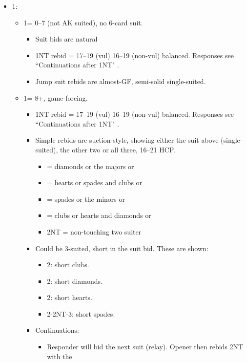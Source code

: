\documentclass[a4paper,14pt]{extarticle}
\begin{document}
\begin{itemize}
\label{note:13}
\item 1\diamonds:
	\begin{itemize}
   \item 1\hearts = 0--7 (not AK suited), no 6-card suit.
		\begin{itemize}
		\item Suit bids are natural
      \item 1NT rebid = 17--19 (vul) 16--19 (non-vul) balanced. Responses see ``Continuations after 1NT" .
      \item Jump suit rebids are almost-GF, semi-solid single-suited.
		\end{itemize}
   \item 1\spades = 8+, game-forcing.
		\begin{itemize}
      \item 1NT rebid = 17--19 (vul) 16--19 (non-vul) balanced. Responses see ``Continuations after 1NT" .
      \item Simple rebids are suction-style, showing either the suit above
         (single-suited), the other two or all three, 16--21 HCP.
			\begin{itemize}
			\item \clubs = diamonds or the majors or \diamonds\hearts\spades
			\item \diamonds = hearts or spades and clubs or \hearts\spades\clubs
			\item \hearts = spades or the minors or \spades\clubs\diamonds
			\item \spades = clubs or hearts and diamonds or \clubs\hearts\diamonds
			\item 2NT = non-touching two suiter
			\end{itemize}
		\item Could be 3-suited, short in the suit bid. These are shown: 
			\begin{itemize}
         \item 2\clubs: short clubs.
			\item 2\diamonds: short diamonds. 
			\item 2\hearts: short hearts.
         \item 2\spades-2NT-3\spades: short spades.
			\end{itemize}
		\item Continuations:
			\begin{itemize}
			\item Responder will bid the next suit (relay). Opener then rebids 2NT with the

\end{itemize}
\end{itemize}
\end{itemize}
\end{itemize}
\end{document}
